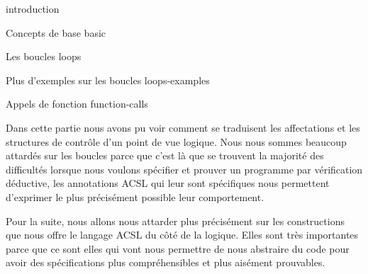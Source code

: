\begin{levelTwo}
  {}
  {introduction}
\end{levelTwo}


\begin{levelTwo}
  {Concepts de base}
  {basic}
\end{levelTwo}

\begin{levelTwo}
  {Les boucles}
  {loops}
\end{levelTwo}

\begin{levelTwo}
  {Plus d'exemples sur les boucles}
  {loops-examples}
\end{levelTwo}

\begin{levelTwo}
  {Appels de fonction}
  {function-calls}
\end{levelTwo}

\horizontalLine


\newpage


Dans cette partie nous avons pu voir comment se traduisent les affectations et
les structures de contrôle d'un point de vue logique. Nous nous sommes beaucoup 
attardés sur les boucles parce que c'est là que se trouvent la majorité des 
difficultés lorsque nous voulons spécifier et prouver un programme par 
vérification déductive, les annotations ACSL qui leur sont spécifiques nous 
permettent d'exprimer le plus précisément possible leur comportement.



Pour la suite, nous allons nous attarder plus précisément sur les constructions
que nous offre le langage ACSL du côté de la logique. Elles sont très 
importantes parce que ce sont elles qui vont nous permettre de nous abstraire
du code pour avoir des spécifications plus compréhensibles et plus aisément 
prouvables.
